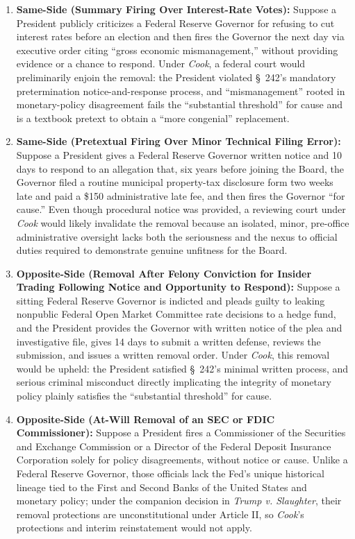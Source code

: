 \documentclass[12pt]{article}
\begin{document}
\begin{enumerate}
    \item \textbf{Same-Side (Summary Firing Over Interest-Rate Votes):} Suppose a President publicly criticizes a Federal Reserve Governor for refusing to cut interest rates before an election and then fires the Governor the next day via executive order citing ``gross economic mismanagement,'' without providing evidence or a chance to respond. Under \textit{Cook}, a federal court would preliminarily enjoin the removal: the President violated \S~242's mandatory pretermination notice-and-response process, and ``mismanagement'' rooted in monetary-policy disagreement fails the ``substantial threshold'' for cause and is a textbook pretext to obtain a ``more congenial'' replacement.
    \item \textbf{Same-Side (Pretextual Firing Over Minor Technical Filing Error):} Suppose a President gives a Federal Reserve Governor written notice and 10 days to respond to an allegation that, six years before joining the Board, the Governor filed a routine municipal property-tax disclosure form two weeks late and paid a \$150 administrative late fee, and then fires the Governor ``for cause.'' Even though procedural notice was provided, a reviewing court under \textit{Cook} would likely invalidate the removal because an isolated, minor, pre-office administrative oversight lacks both the seriousness and the nexus to official duties required to demonstrate genuine unfitness for the Board.
    \item \textbf{Opposite-Side (Removal After Felony Conviction for Insider Trading Following Notice and Opportunity to Respond):} Suppose a sitting Federal Reserve Governor is indicted and pleads guilty to leaking nonpublic Federal Open Market Committee rate decisions to a hedge fund, and the President provides the Governor with written notice of the plea and investigative file, gives 14 days to submit a written defense, reviews the submission, and issues a written removal order. Under \textit{Cook}, this removal would be upheld: the President satisfied \S~242's minimal written process, and serious criminal misconduct directly implicating the integrity of monetary policy plainly satisfies the ``substantial threshold'' for cause.
    \item \textbf{Opposite-Side (At-Will Removal of an SEC or FDIC Commissioner):} Suppose a President fires a Commissioner of the Securities and Exchange Commission or a Director of the Federal Deposit Insurance Corporation solely for policy disagreements, without notice or cause. Unlike a Federal Reserve Governor, those officials lack the Fed's unique historical lineage tied to the First and Second Banks of the United States and monetary policy; under the companion decision in \textit{Trump v. Slaughter}, their removal protections are unconstitutional under Article II, so \textit{Cook}'s protections and interim reinstatement would not apply.

\end{enumerate}
\end{document}
